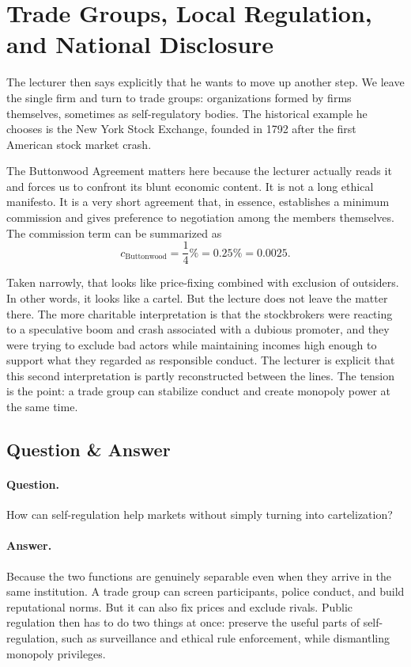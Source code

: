 \section{Trade Groups, Local Regulation, and National Disclosure}

The lecturer then says explicitly that he wants to move up another step. We leave the single firm and turn to trade groups: organizations formed by firms themselves, sometimes as self-regulatory bodies. The historical example he chooses is the New York Stock Exchange, founded in 1792 after the first American stock market crash.

The Buttonwood Agreement matters here because the lecturer actually reads it and forces us to confront its blunt economic content. It is not a long ethical manifesto. It is a very short agreement that, in essence, establishes a minimum commission and gives preference to negotiation among the members themselves. The commission term can be summarized as
\begin{equation}
c_{\text{Buttonwood}}=\frac{1}{4}\%=0.25\%=0.0025.
\end{equation}

Taken narrowly, that looks like price-fixing combined with exclusion of outsiders. In other words, it looks like a cartel. But the lecture does not leave the matter there. The more charitable interpretation is that the stockbrokers were reacting to a speculative boom and crash associated with a dubious promoter, and they were trying to exclude bad actors while maintaining incomes high enough to support what they regarded as responsible conduct. The lecturer is explicit that this second interpretation is partly reconstructed between the lines. The tension is the point: a trade group can stabilize conduct and create monopoly power at the same time.

\subsection{Question \& Answer}

\paragraph{Question.} How can self-regulation help markets without simply turning into cartelization?

\paragraph{Answer.} Because the two functions are genuinely separable even when they arrive in the same institution. A trade group can screen participants, police conduct, and build reputational norms. But it can also fix prices and exclude rivals. Public regulation then has to do two things at once: preserve the useful parts of self-regulation, such as surveillance and ethical rule enforcement, while dismantling monopoly privileges.

